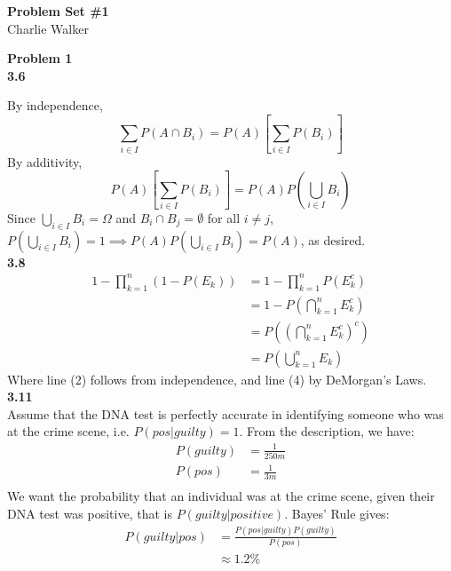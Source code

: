 \documentclass[letterpaper,12pt]{article}
\theoremstyle{definition}
\begin{document}
\begin{flushleft}
  \textbf{\large{Problem Set \#1}} \\
  Charlie Walker
\end{flushleft}
\vspace{5mm}
\noindent\textbf{Problem 1} \\

\noindent\textbf{3.6}

\noindent By independence,
\begin{equation*}
\sum_{i \in I}P(A \cap B_i) = P(A)[\sum_{i \in I}P(B_i)] 
\end{equation*}
By additivity,
\begin{equation*}
P(A)[\sum_{i \in I}P(B_i)] = P(A)P(\bigcup_{i \in I} B_i)
\end{equation*}
Since $\bigcup_{i \in I} B_i= \Omega$ and $B_i \cap B_j = \emptyset$ for all  $i \neq j$, $P(\bigcup_{i \in I} B_i) = 1 \implies P(A)P(\bigcup_{i \in I} B_i) = P(A)$, as desired.\newline\\
\noindent\textbf{3.8}\\
\noindent
\begin{equation*}
\begin{split}
1 - \prod^{n}_{k=1}(1 - P(E_k)) & = 1 - \prod^{n}_{k=1}P(E^{c}_{k}) \\
& = 1 - P(\bigcap^{n}_{k=1}E^{c}_{k})\\
& = P((\bigcap^{n}_{k=1}E^{c}_{k})^{c}) \\
& = P(\bigcup^{n}_{k=1}E_k) 
\end{split}
\end{equation*}
Where line (2) follows from independence, and line (4) by DeMorgan's Laws.\newline\\
\noindent\textbf{3.11}\\
\noindent Assume that the DNA test is perfectly accurate in identifying someone who was at the crime scene, i.e. $P(pos | guilty) = 1$. From the description, we have:
\begin{align*}
P(guilty) &= \frac{1}{250m} \\
P(pos) &= \frac{1}{3m} \\
\end{align*}
We want the probability that an individual was at the crime scene, given their DNA test was positive, that is $P(guilty | positive)$. Bayes' Rule gives:
\begin{equation*}
\begin{split}
P(guilty | pos) &= \frac{P(pos | guilty)P(guilty)}{P(pos)}\\
&\approx 1.2\%
\end{split}
\end{equation*}\newline\\
\end{document}

